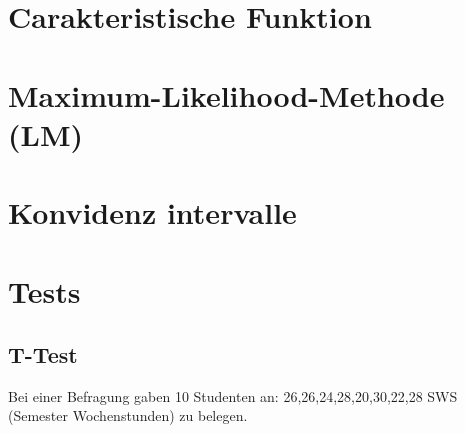 \documentclass[a4paper, 11pt]{article}
\begin{document}
\section{Carakteristische Funktion}
\section{Maximum-Likelihood-Methode (LM)}
\section{Konvidenz intervalle}
\section{Tests}
\subsection{T-Test}
Bei einer Befragung gaben 10 Studenten an: 26,26,24,28,20,30,22,28 SWS (Semester Wochenstunden) zu belegen.
\end{document}
